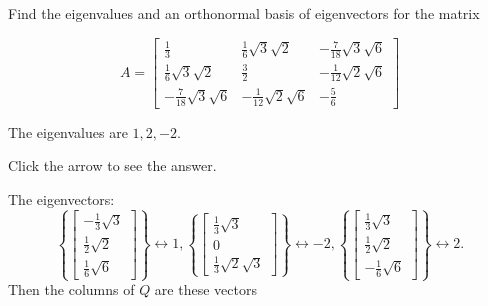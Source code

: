 \documentclass{ximera}
\begin{document}
 \begin{problem}\label{prb:9.11} Find the eigenvalues and an orthonormal basis of eigenvectors for the
matrix

\begin{equation*}
A = \left[
\begin{array}{ccc}
 \frac{1}{3} &  \frac{1}{6}\sqrt{3}\sqrt{2} & -
 \frac{7}{18}\sqrt{3}\sqrt{6} \\
 \frac{1}{6}\sqrt{3}\sqrt{2} &  \frac{3}{2} & -
 \frac{1}{12}\sqrt{2}\sqrt{6} \\
- \frac{7}{18}\sqrt{3}\sqrt{6} & - \frac{1}{12}
\sqrt{2}\sqrt{6} & - \frac{5}{6}
\end{array}
\right]
\end{equation*}

\begin{hint} 
The eigenvalues are $1,2,-2.$

Click the arrow to see the answer. \begin{expandable}
The eigenvectors:
\[
\left\{ \left[
\begin{array}{c}
-\frac{1}{3}\sqrt{3} \\
\frac{1}{2}\sqrt{2} \\
\frac{1}{6}\sqrt{6}
\end{array}
\right] \right\} \leftrightarrow 1,\left\{ \left[
\begin{array}{c}
\frac{1}{3}\sqrt{3} \\
0 \\
\frac{1}{3}\sqrt{2}\sqrt{3}
\end{array}
\right] \right\} \leftrightarrow -2,  \left\{ \left[
\begin{array}{c}
\frac{1}{3}\sqrt{3} \\
\frac{1}{2}\sqrt{2} \\
-\frac{1}{6}\sqrt{6}
\end{array}
\right] \right\} \leftrightarrow 2.
\]
Then the columns of $Q$ are these vectors
\end{expandable} \end{hint}
\end{problem}
\end{document}
